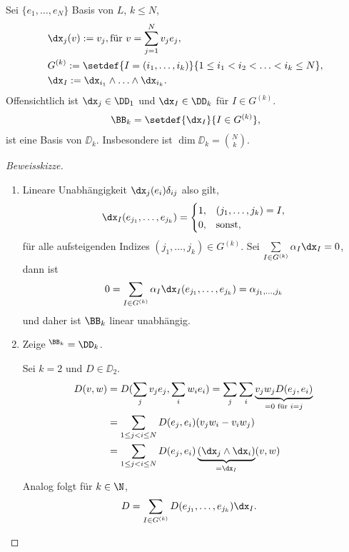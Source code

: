 \begin{prop}[Basis]
\label{prop:4.70}
Sei $\{e_1,\ldots,e_N\}$ Basis von $L$, $k\le N$,
\begin{align*}
&\dx_j(v) := v_j, \text{für } v = \sum\limits_{j=1}^N v_j e_j,\\
& G^{(k)} := \setdef{I=(i_1,\ldots,i_k)}{1\le i_1 < i_2 <\ldots <i_k \le N},\\
&\dx_I := \dx_{i_1}\land \ldots \land \dx_{i_k}.
\end{align*}
Offensichtlich ist $\dx_j\in\DD_1$ und $\dx_I\in\DD_k$ für $I\in G^{(k)}$.
\begin{align*}
\BB_k = \setdef{\dx_I}{I\in G^{(k)}},
\end{align*}
ist eine Basis von $\DD_k$. Insbesondere ist $\dim\DD_k = \binom{N}{k}$.
\end{prop}
\begin{proof}[Beweisskizze]
\begin{enumerate}[label=\arabic{*}.)]
\item Lineare Unabhängigkeit
$\dx_j(e_i) \delta_{ij}$ also gilt,
\begin{align*}
\dx_I(e_{j_1},\ldots,e_{j_k}) = \begin{cases}
1,& (j_1,\ldots,j_k) = I,\\
0,& \text{sonst},
\end{cases}
\end{align*} 
für alle aufsteigenden Indizes $(j_1,\ldots,j_k)\in G^{(k)}$.
Sei $\sum\limits_{I\in G^{(k)}} \alpha_I \dx_I = 0$, dann ist
\begin{align*}
0 = \sum\limits_{I\in G^{(k)}} \alpha_I \dx_I(e_{j_1},\ldots,e_{j_k}) =
\alpha_{j_1,\ldots,j_k}
\end{align*}
und daher ist $\BB_k$ linear unabhängig.
\item Zeige $\sp{\BB_k} = \DD_k$.

Sei $k=2$ und $D\in\DD_2$.
\begin{align*}
D(v,w) &= D(\sum_j v_j e_j, \sum_i w_i e_i) = \sum_j\sum_i \underbrace{v_j w_j
D(e_j,e_i)}_{=0\text{ für }i=j} \\
&= \sum\limits_{1\le j < i \le N} D(e_j,e_i)(v_jw_i - v_i w_j)\\
&= \sum\limits_{1\le j < i \le N} D(e_j,e_i)\underbrace{(\dx_j\land\dx_i)}_{=\dx_I}(v,w)
\end{align*}
Analog folgt für $k\in\N$,
\begin{align*}
D &=  \sum\limits_{I\in G^{(k)}} D(e_{j_1},\ldots,e_{j_k}) \dx_I.\qedhere
\end{align*}
\end{enumerate}
\end{proof}
